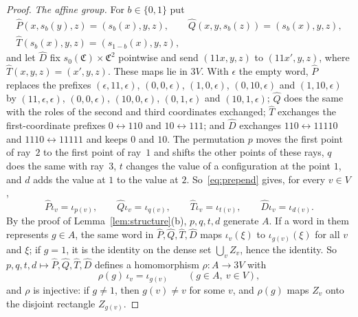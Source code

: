 \begin{proof}
\emph{The affine group.} For $b\in\{0,1\}$ put
\begin{gather*}
\hat P(x,s_b(y),z)=(s_b(x),y,z),\qquad \hat Q(x,y,s_b(z))=(s_b(x),y,z),\\
\hat T(s_b(x),y,z)=(s_{1-b}(x),y,z),
\end{gather*}
and let $\hat D$ fix $s_0(\mathfrak C)\times\mathfrak C^2$ pointwise and send $(11x,y,z)$ to $(11x',y,z)$, where $\hat T(x,y,z)=(x',y,z)$. These maps lie
in $3V$. With $\epsilon$ the empty word, $\hat P$ replaces the prefixes $(\epsilon,11,\epsilon)$, $(0,0,\epsilon)$, $(1,0,\epsilon)$, $(0,10,\epsilon)$ and
$(1,10,\epsilon)$ by $(11,\epsilon,\epsilon)$, $(0,0,\epsilon)$, $(10,0,\epsilon)$, $(0,1,\epsilon)$ and $(10,1,\epsilon)$; $\hat Q$ does the same with the roles
of the second and third coordinates exchanged; $\hat T$ exchanges the first-coordinate prefixes $0\leftrightarrow110$ and $10\leftrightarrow111$; and $\hat D$
exchanges $110\leftrightarrow11110$ and $1110\leftrightarrow11111$ and keeps $0$ and $10$. The permutation $p$ moves the first point of ray~$2$ to
the first point of ray~$1$ and shifts the other points of these rays, $q$ does the same with ray~$3$, $t$ changes the value of a configuration at
the point $1$, and $d$ adds the value at $1$ to the value at $2$. So~\eqref{eq:prepend} gives, for every $v\in V$,
\[
\hat P\iota_v=\iota_{p(v)},\qquad \hat Q\iota_v=\iota_{q(v)},\qquad \hat T\iota_v=\iota_{t(v)},\qquad \hat D\iota_v=\iota_{d(v)} .
\]
By the proof of Lemma~\ref{lem:structure}(b), $p,q,t,d$ generate $A$. If a word in them represents $g\in A$, the same word in $\hat P,\hat Q,\hat T,\hat D$ maps
$\iota_v(\xi)$ to $\iota_{g(v)}(\xi)$ for all $v$ and $\xi$; if $g=1$, it is the identity on the dense set $\bigcup_vZ_v$, hence the identity. So
$p,q,t,d\mapsto\hat P,\hat Q,\hat T,\hat D$ defines a homomorphism $\rho:A\to3V$ with
\begin{equation}\label{eq:3V-equivariant}
\rho(g)\,\iota_v=\iota_{g(v)}\qquad(g\in A,\ v\in V),
\end{equation}
and $\rho$ is injective: if $g\ne1$, then $g(v)\ne v$ for some $v$, and $\rho(g)$ maps $Z_v$ onto the disjoint rectangle $Z_{g(v)}$.


\end{proof}
